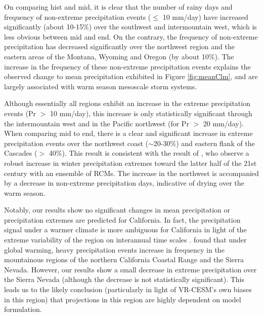 On comparing \textsf{hist} and \textsf{mid}, it is clear that the number of rainy days and frequency of non-extreme precipitation events ($\leq$ 10 mm/day) have increased significantly (about 10-15$\%$) over the southwest and intermountain west, which is less obvious between \textsf{mid} and \textsf{end}. On the contrary, the frequency of non-extreme precipitation has decreased significantly over the northwest region and the eastern areas of the Montana, Wyoming and Oregon (by about 10$\%$).  The increase in the frequency of these non-extreme precipitation events explains the observed change to mean precipitation exhibited in Figure \ref{fig:meanClm}, and are largely associated with warm season mesoscale storm systems.


Although essentially all regions exhibit an increase in the extreme precipitation events (Pr $>$ 10 mm/day), this increase is only statistically significant through the intermountain west and in the Pacific northwest (for Pr $>$ 20 mm/day).  When comparing \textsf{mid} to \textsf{end}, there is a clear and significant increase in extreme precipitation events over the northwest coast ($\sim$20-30$\%$) and eastern flank of the Cascades ($>$ 40$\%$). This result is consistent with the result of \cite{dominguez2012changes}, who observe a robust increase in winter precipitation extremes toward the latter half of the 21st century with an ensemble of RCMs.  The increase in the northwest is accompanied by a decrease in non-extreme precipitation days, indicative of drying over the warm season.  


Notably, our results show no significant changes in mean precipitation or precipitation extremes are predicted for California.  In fact, the precipitation signal under a warmer climate is more ambiguous for California \cite{neelin2013california} in light of the extreme variability of the region on interannual time scales \cite{dettinger2011climate}. \cite{kim2005projection} found that under global warming, heavy precipitation events increase in frequency in the mountainous regions of the northern California Coastal Range and the Sierra Nevada. However, our results show a small decrease in extreme precipitation over the Sierra Nevada (although the decrease is not statistically significant).  This leads us to the likely conclusion (particularly in light of VR-CESM's own biases in this region) that projections in this region are highly dependent on model formulation.


